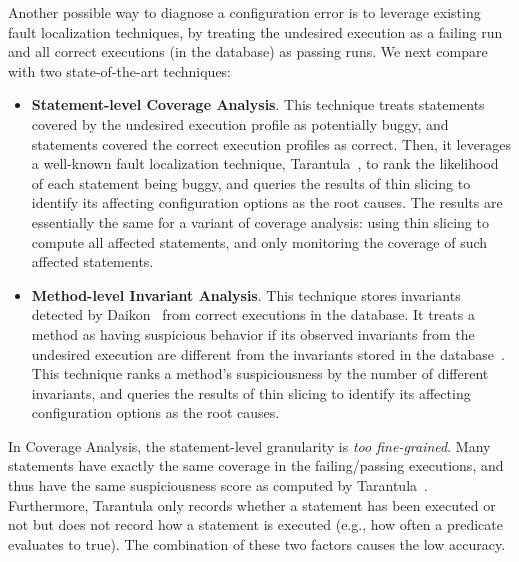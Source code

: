 

Another possible way to diagnose a configuration error is to leverage
existing fault localization techniques, by treating the undesired
execution as a failing run and all correct executions (in the database)
as passing runs. We next compare \ourtool with two state-of-the-art
techniques: %

\begin{itemize}
\item \textbf{Statement-level Coverage Analysis}. This technique treats statements covered
by the undesired execution profile as potentially buggy, and statements
covered the correct execution profiles as correct.
Then, it leverages a well-known fault localization technique,
Tarantula~\cite{Jones:2002}, to rank the likelihood of each
statement being buggy, and queries the results of thin slicing
to identify its affecting configuration options as the root causes.
The results are essentially the same for a variant of
coverage analysis: using thin slicing to compute all affected statements,
and only monitoring the coverage of such affected statements.

\item \textbf{Method-level Invariant Analysis}. This technique stores invariants detected
by Daikon~\cite{Ernst:1999} from correct executions in the database.
It treats a method as having suspicious behavior if its observed invariants
from the undesired execution are different from the invariants stored
in the database~\cite{McCamant:2003}. This technique ranks a method's suspiciousness by
the number of different invariants, and queries the results of thin slicing
to identify its affecting configuration options as the root causes. 
\end{itemize}


In Coverage Analysis, the statement-level granularity is \textit{too fine-grained}.
Many statements have exactly the same coverage in the failing/passing executions,
and thus have the same suspiciousness score as computed by Tarantula~\cite{Jones:2002}.
Furthermore, Tarantula only records whether a
statement has been executed or not but does not record how a statement is 
executed (e.g., how often a predicate evaluates to true). The combination
of these two factors causes the low accuracy.


